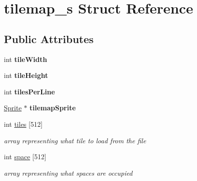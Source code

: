 \hypertarget{structtilemap__s}{}\section{tilemap\+\_\+s Struct Reference}
\label{structtilemap__s}
\subsection*{Public Attributes}
\begin{DoxyCompactItemize}
\item 
\mbox{\label{structtilemap__s_a193b0be6f88485194f4624d5d03c59ad}} 
int {\bfseries tile\+Width}
\item 
\mbox{\label{structtilemap__s_a5e7730dd4c5afae2094dd7081859ad72}} 
int {\bfseries tile\+Height}
\item 
\mbox{\label{structtilemap__s_a26802b51af4ceb714e1780ebe3a00c6d}} 
int {\bfseries tiles\+Per\+Line}
\item 
\mbox{\label{structtilemap__s_aa02a88c95bc2ddc764f54c5555de4ba7}} 
\hyperlink{struct_sprite___s}{Sprite} $\ast$ {\bfseries tilemap\+Sprite}
\item 
\mbox{\label{structtilemap__s_acc152e2e426a0debd81ec5ff3e3e05a0}} 
int \hyperlink{structtilemap__s_acc152e2e426a0debd81ec5ff3e3e05a0}{tiles} \mbox{[}512\mbox{]}
\begin{DoxyCompactList}\small\item\em array representing what tile to load from the file \end{DoxyCompactList}\item 
\mbox{\label{structtilemap__s_ad2a473af1a4489dce987f631cc1c3e43}} 
int \hyperlink{structtilemap__s_ad2a473af1a4489dce987f631cc1c3e43}{space} \mbox{[}512\mbox{]}
\begin{DoxyCompactList}\small\item\em array representing what spaces are occupied \end{DoxyCompactList}\item 
\mbox{\label{structtilemap__s_a0d81df52f423f0a6d4031a9a4db4d875}} 

\end{DoxyCompactItemize}
